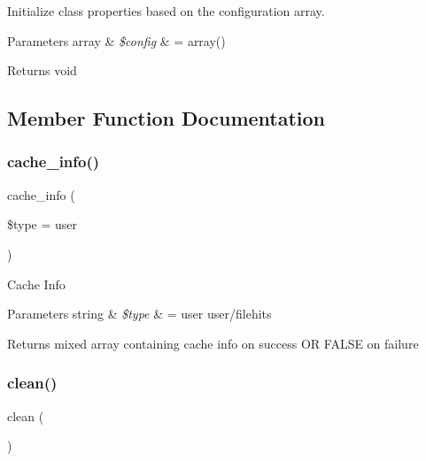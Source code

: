 Initialize class properties based on the configuration array.


\begin{DoxyParams}[1]{Parameters}
array & {\em \$config} & = array() \\
\hline
\end{DoxyParams}
\begin{DoxyReturn}{Returns}
void 
\end{DoxyReturn}


\subsection{Member Function Documentation}
\mbox{\label{class_c_i___cache_a26b8f7eef651dc3c0b5b9e1d8661a9ae}} 
\subsubsection{\texorpdfstring{cache\+\_\+info()}{cache\_info()}}
{\footnotesize\ttfamily cache\+\_\+info (\begin{DoxyParamCaption}\item[{}]{\$type = {\ttfamily \textquotesingle{}user\textquotesingle{}} }\end{DoxyParamCaption})}

Cache Info


\begin{DoxyParams}[1]{Parameters}
string & {\em \$type} & = \textquotesingle{}user\textquotesingle{} user/filehits \\
\hline
\end{DoxyParams}
\begin{DoxyReturn}{Returns}
mixed array containing cache info on success OR F\+A\+L\+SE on failure 
\end{DoxyReturn}
\mbox{\label{class_c_i___cache_adb40b812890a8bc058bf6b7a0e1a54d9}} 
\subsubsection{\texorpdfstring{clean()}{clean()}}
{\footnotesize\ttfamily clean (\begin{DoxyParamCaption}{ }\end{DoxyParamCaption})}


